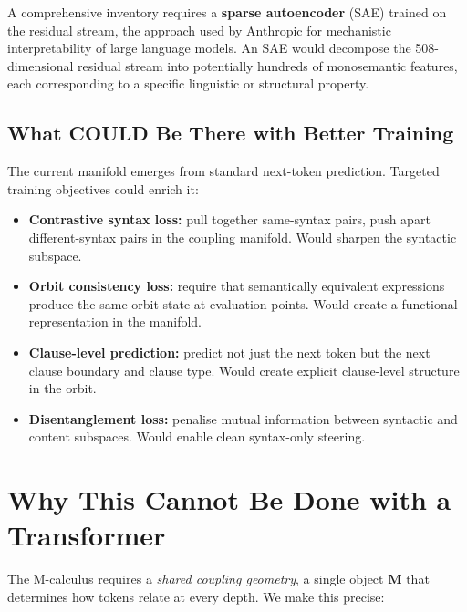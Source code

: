 \documentclass[11pt, a4paper]{article}
\newcommand{\M}{\mathbf{M}}
\theoremstyle{plain}
\theoremstyle{definition}
\theoremstyle{remark}
\begin{document}
A comprehensive inventory requires a \textbf{sparse autoencoder} (SAE) trained on the residual stream, the approach used by Anthropic for mechanistic interpretability of large language models.
An SAE would decompose the 508-dimensional residual stream into potentially hundreds of monosemantic features, each corresponding to a specific linguistic or structural property.

\subsection{What COULD Be There with Better Training}

The current manifold emerges from standard next-token prediction.
Targeted training objectives could enrich it:

\begin{itemize}[nosep]
\item \textbf{Contrastive syntax loss:} pull together same-syntax pairs, push apart different-syntax pairs in the coupling manifold.
    Would sharpen the syntactic subspace.
\item \textbf{Orbit consistency loss:} require that semantically equivalent expressions produce the same orbit state at evaluation points.
    Would create a functional representation in the manifold.
\item \textbf{Clause-level prediction:} predict not just the next token but the next clause boundary and clause type.
    Would create explicit clause-level structure in the orbit.
\item \textbf{Disentanglement loss:} penalise mutual information between syntactic and content subspaces.
    Would enable clean syntax-only steering.
\end{itemize}

\section{Why This Cannot Be Done with a Transformer}
\label{sec:impossibility}

The M-calculus requires a \emph{shared coupling geometry}, a single object $\M$ that determines how tokens relate at every depth.
We make this precise:
\end{document}
